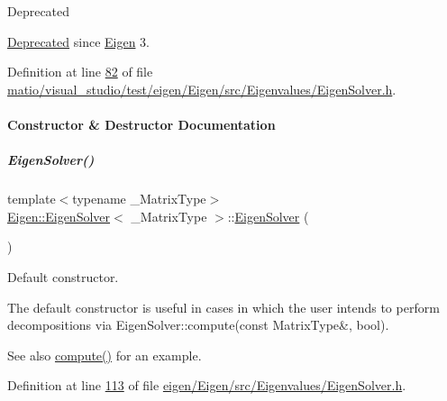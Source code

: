\begin{DoxyRefDesc}{Deprecated}
\item[\hyperlink{deprecated__deprecated000062}{Deprecated}]since \hyperlink{namespace_eigen}{Eigen} 3. \end{DoxyRefDesc}


Definition at line \hyperlink{matio_2visual__studio_2test_2eigen_2_eigen_2src_2_eigenvalues_2_eigen_solver_8h_source_l00082}{82} of file \hyperlink{matio_2visual__studio_2test_2eigen_2_eigen_2src_2_eigenvalues_2_eigen_solver_8h_source}{matio/visual\+\_\+studio/test/eigen/\+Eigen/src/\+Eigenvalues/\+Eigen\+Solver.\+h}.



\paragraph{Constructor \& Destructor Documentation}
\mbox{\label{group___eigenvalues___module_a3af22d721a6401365881b2ef252d26aa}} 
\subparagraph{\texorpdfstring{Eigen\+Solver()}{EigenSolver()}\hspace{0.1cm}{\footnotesize\ttfamily [1/6]}}
{\footnotesize\ttfamily template$<$typename \+\_\+\+Matrix\+Type$>$ \\
\hyperlink{group___eigenvalues___module_class_eigen_1_1_eigen_solver}{Eigen\+::\+Eigen\+Solver}$<$ \+\_\+\+Matrix\+Type $>$\+::\hyperlink{group___eigenvalues___module_class_eigen_1_1_eigen_solver}{Eigen\+Solver} (\begin{DoxyParamCaption}{ }\end{DoxyParamCaption})\hspace{0.3cm}{\ttfamily [inline]}}



Default constructor. 

The default constructor is useful in cases in which the user intends to perform decompositions via Eigen\+Solver\+::compute(const Matrix\+Type\&, bool).

\begin{DoxySeeAlso}{See also}
\hyperlink{group___eigenvalues___module_a38d032b75b3e75640e3db42e7ab20c24}{compute()} for an example. 
\end{DoxySeeAlso}


Definition at line \hyperlink{eigen_2_eigen_2src_2_eigenvalues_2_eigen_solver_8h_source_l00113}{113} of file \hyperlink{eigen_2_eigen_2src_2_eigenvalues_2_eigen_solver_8h_source}{eigen/\+Eigen/src/\+Eigenvalues/\+Eigen\+Solver.\+h}.

